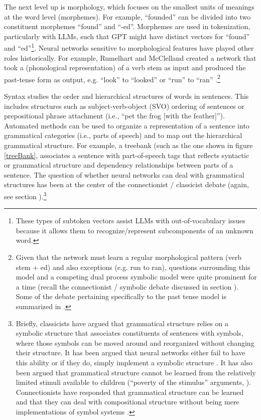 The next level up is morphology, which focuses on the smallest units of meanings at the word level (morphemes). For example, ``founded'' can be divided into two constituent morphemes ``found'' and ``-ed''.  Morphemes are used in tokenization, particularly with LLMs, such that GPT might have distinct vectors for ``found'' and ``ed''\footnote{These types of subtoken vectors assist LLMs with out-of-vocabulary issues because it allows them to recognize/represent subcomponents of an unknown word.}.  Neural networks sensitive to morphological features have played other roles historically. For example, Rumelhart and McClelland created a network that took a (phonological representation) of a verb stem as input and produced the past-tense form as output, e.g. ``look'' to ``looked'' or ``run'' to ``ran'' \cite{rumelhart1986learning}.\footnote{Given that the network must learn a regular morphological pattern (verb stem + ed) and also exceptions (e.g. run to ran), questions surrounding this model and a competing dual process symbolic model were quite prominent for a time (recall the connectionist / symbolic debate discussed in section ). Some of the debate pertaining specifically to the past tense model is summarized in \cite{pinker2002past}.}  

Syntax studies the order and hierarchical structures of words in sentences. This includes structures such as subject-verb-object (SVO) ordering of sentences or prepositional phrase attachment (i.e., ``pet the frog [with the feather]''). Automated methods can be used to organize a representation of a sentence into grammatical categories (i.e., parts of speech) and to map out the hierarchical grammatical structure. For example, a treebank (such as the one shown in figure \ref{treeBank}, associates a sentence with part-of-speech tags that reflects syntactic or grammatical structure and dependency relationships between parts of a sentence. The question of whether neural networks can deal with grammatical structures has been at the center of the connectionist / classicist debate (again, see section ).\footnote{Briefly, classicists have argued that grammatical structure relies on a symbolic structure that associates constituents of sentences with symbols, where those symbols can be moved around and reorganized without changing their structure. It has been argued that neural networks either fail to have this ability or if they do, simply implement a symbolic structure \cite{fodor1988connectionism}. It has also been argued that grammatical structure cannot be learned from the relatively limited stimuli available to children (``poverty of the stimulus'' arguments, \cite{berwick2011poverty}). Connectionists have responded that grammatical structure can be learned \cite{elman1996rethinking} and that they can deal with compositional structure without being mere implementations of symbol systems \cite{smolensky1988proper}.}

